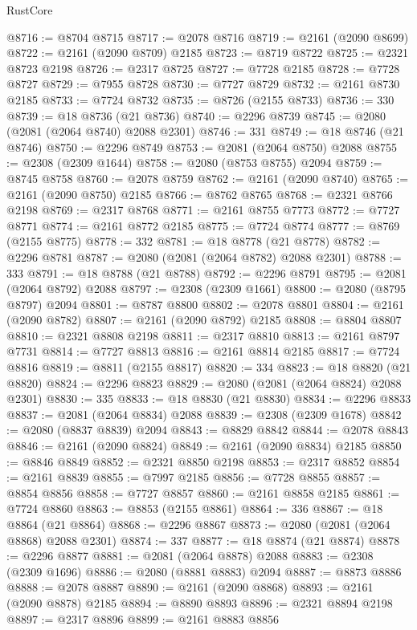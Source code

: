 \begin{lexlean}{RustCore}
\begin{coremodule}
@8716 := @8704 @8715
@8717 := @2078 @8716
@8719 := @2161 (@2090 @8699)
@8722 := @2161 (@2090 @8709) @2185
@8723 := @8719 @8722
@8725 := @2321 @8723 @2198
@8726 := @2317 @8725
@8727 := @7728 @2185
@8728 := @7728 @8727
@8729 := @7955 @8728
@8730 := @7727 @8729
@8732 := @2161 @8730 @2185
@8733 := @7724 @8732
@8735 := @8726 (@2155 @8733)
@8736 := 330
@8739 := @18 @8736 (@21 @8736)
@8740 := @2296 @8739
@8745 := @2080 (@2081 (@2064 @8740) @2088 @2301)
@8746 := 331
@8749 := @18 @8746 (@21 @8746)
@8750 := @2296 @8749
@8753 := @2081 (@2064 @8750) @2088
@8755 := @2308 (@2309 @1644)
@8758 := @2080 (@8753 @8755) @2094
@8759 := @8745 @8758
@8760 := @2078 @8759
@8762 := @2161 (@2090 @8740)
@8765 := @2161 (@2090 @8750) @2185
@8766 := @8762 @8765
@8768 := @2321 @8766 @2198
@8769 := @2317 @8768
@8771 := @2161 @8755 @7773
@8772 := @7727 @8771
@8774 := @2161 @8772 @2185
@8775 := @7724 @8774
@8777 := @8769 (@2155 @8775)
@8778 := 332
@8781 := @18 @8778 (@21 @8778)
@8782 := @2296 @8781
@8787 := @2080 (@2081 (@2064 @8782) @2088 @2301)
@8788 := 333
@8791 := @18 @8788 (@21 @8788)
@8792 := @2296 @8791
@8795 := @2081 (@2064 @8792) @2088
@8797 := @2308 (@2309 @1661)
@8800 := @2080 (@8795 @8797) @2094
@8801 := @8787 @8800
@8802 := @2078 @8801
@8804 := @2161 (@2090 @8782)
@8807 := @2161 (@2090 @8792) @2185
@8808 := @8804 @8807
@8810 := @2321 @8808 @2198
@8811 := @2317 @8810
@8813 := @2161 @8797 @7731
@8814 := @7727 @8813
@8816 := @2161 @8814 @2185
@8817 := @7724 @8816
@8819 := @8811 (@2155 @8817)
@8820 := 334
@8823 := @18 @8820 (@21 @8820)
@8824 := @2296 @8823
@8829 := @2080 (@2081 (@2064 @8824) @2088 @2301)
@8830 := 335
@8833 := @18 @8830 (@21 @8830)
@8834 := @2296 @8833
@8837 := @2081 (@2064 @8834) @2088
@8839 := @2308 (@2309 @1678)
@8842 := @2080 (@8837 @8839) @2094
@8843 := @8829 @8842
@8844 := @2078 @8843
@8846 := @2161 (@2090 @8824)
@8849 := @2161 (@2090 @8834) @2185
@8850 := @8846 @8849
@8852 := @2321 @8850 @2198
@8853 := @2317 @8852
@8854 := @2161 @8839
@8855 := @7997 @2185
@8856 := @7728 @8855
@8857 := @8854 @8856
@8858 := @7727 @8857
@8860 := @2161 @8858 @2185
@8861 := @7724 @8860
@8863 := @8853 (@2155 @8861)
@8864 := 336
@8867 := @18 @8864 (@21 @8864)
@8868 := @2296 @8867
@8873 := @2080 (@2081 (@2064 @8868) @2088 @2301)
@8874 := 337
@8877 := @18 @8874 (@21 @8874)
@8878 := @2296 @8877
@8881 := @2081 (@2064 @8878) @2088
@8883 := @2308 (@2309 @1696)
@8886 := @2080 (@8881 @8883) @2094
@8887 := @8873 @8886
@8888 := @2078 @8887
@8890 := @2161 (@2090 @8868)
@8893 := @2161 (@2090 @8878) @2185
@8894 := @8890 @8893
@8896 := @2321 @8894 @2198
@8897 := @2317 @8896
@8899 := @2161 @8883 @8856

\end{coremodule}
\end{lexlean}
